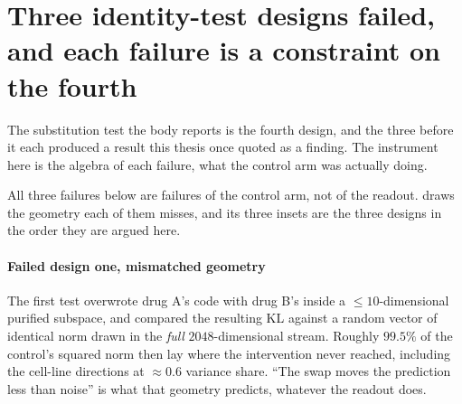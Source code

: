 
\framedecl{-}
\section{Three identity-test designs failed, and each failure is a constraint on the fourth}
\label{sec:app-identity}

\begin{question}
The substitution test the body reports is the fourth design, and the three
before it each produced a result this thesis once quoted as a finding. The
instrument here is the algebra of each failure, what the control arm was
actually doing.
\end{question}

\noindent
All three failures below are failures of the control arm, not of the readout.
 draws the geometry each of them misses, and its three insets are
the three designs in the order they are argued here.



\paragraph{Failed design one, mismatched geometry} The first test overwrote drug
A's code with drug B's inside a $\leq 10$-dimensional purified subspace, and
compared the resulting KL against a random vector of identical norm drawn in the
\emph{full} $2048$-dimensional stream. Roughly $99.5\%$ of the control's
squared norm then lay where the intervention never reached, including the
cell-line directions at $\approx 0.6$ variance share. ``The swap moves the
prediction less than noise'' is what that geometry predicts, whatever the
readout does.

